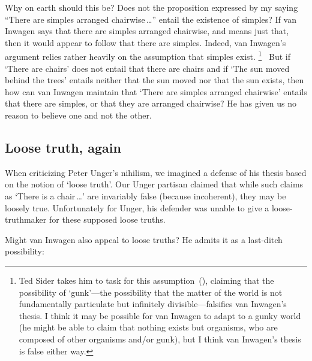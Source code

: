 \documentclass[11pt]{article}
\begin{document}
\begin{spacing}{1.5}
Why on earth should this be? Does not the proposition expressed by my
saying ``There are simples arranged chairwise\,\ldots '' entail the
existence of simples?  If van Inwagen says that there are simples
arranged chairwise, and means just that, then it would appear to
follow that there are simples.  Indeed, van Inwagen's argument relies
rather heavily on the assumption that simples exist.
%
\footnote{Ted Sider takes him to task for this
  assumption~(\citeyear{sider1993}), claiming that the possibility of
  `gunk'---the possibility that the matter of the world is not
  fundamentally particulate but infinitely divisible---falsifies van
  Inwagen's thesis.  I think it may be possible for van Inwagen to
  adapt to a gunky world (he might be able to claim that nothing
  exists but organisms, who are composed of other organisms and/or
  gunk), but I think van Inwagen's thesis is false either way.}
%
\ But if `There are chairs' does not entail that there are chairs and
if `The sun moved behind the trees' entails neither that the sun moved
nor that the sun exists, then how can van Inwagen maintain that `There
are simples arranged chairwise' entails that there are simples, or
that they are arranged chairwise?  He has given us no reason to
believe one and not the other.

\subsection{Loose truth, again}
\label{loose-v}
When criticizing Peter Unger's nihilism, we imagined a defense of his
thesis based on the notion of `loose truth'.  Our Unger partisan
claimed that while such claims as `There is a chair\,\ldots ' are
invariably false (because incoherent), they may be loosely true.
Unfortunately for Unger, his defender was unable to give a
loose-truthmaker for these supposed loose truths.

Might van Inwagen also appeal to loose truths?  He admits it as a
last-ditch possibility:


\end{spacing}
\end{document}
